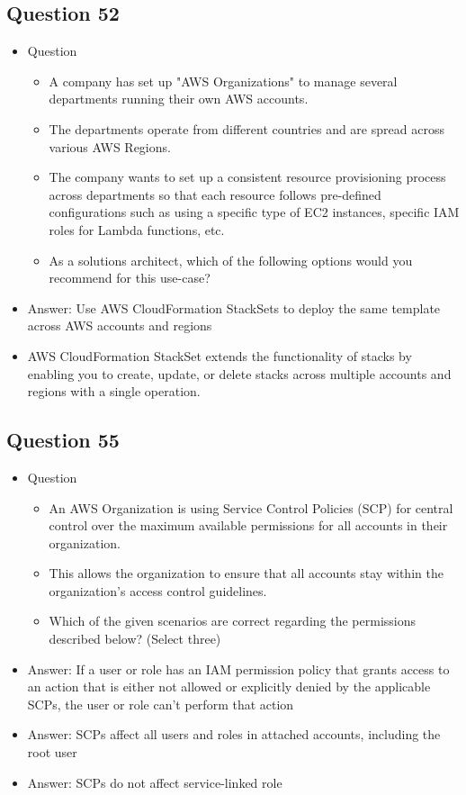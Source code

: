 \documentclass[]{scrartcl}
\begin{document}
\subsection{Question 52}
\begin{itemize}
	\item Question
	\begin{itemize}
		\item A company has set up "AWS Organizations" to manage several departments running their own AWS accounts. 
		\item The departments operate from different countries and are spread across various AWS Regions. 
		\item The company wants to set up a consistent resource provisioning process across departments so that each resource follows pre-defined configurations such as using a specific type of EC2 instances, specific IAM roles for Lambda functions, etc.
		\item As a solutions architect, which of the following options would you recommend for this use-case?
	\end{itemize}
	\item Answer: Use AWS CloudFormation StackSets to deploy the same template across AWS accounts and regions
	\item AWS CloudFormation StackSet extends the functionality of stacks by enabling you to create, update, or delete stacks across multiple accounts and regions with a single operation. 
\end{itemize}

\subsection{Question 55}
\begin{itemize}
	\item Question
	\begin{itemize}
		\item An AWS Organization is using Service Control Policies (SCP) for central control over the maximum available permissions for all accounts in their organization. 
		\item This allows the organization to ensure that all accounts stay within the organization’s access control guidelines.
		\item Which of the given scenarios are correct regarding the permissions described below? (Select three)
	\end{itemize}
	\item Answer: If a user or role has an IAM permission policy that grants access to an action that is either not allowed or explicitly denied by the applicable SCPs, the user or role can't perform that action
	\item Answer: SCPs affect all users and roles in attached accounts, including the root user
	\item Answer: SCPs do not affect service-linked role
\end{itemize}
\end{document}
